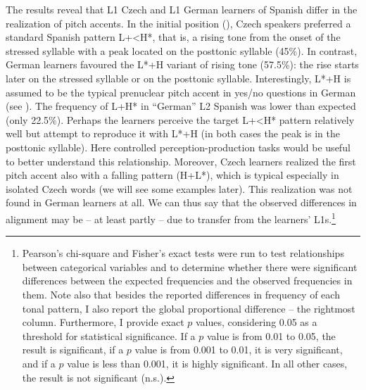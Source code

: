 The results reveal that L1 Czech and L1 German learners of Spanish differ in the realization of pitch accents. In the initial position (), Czech speakers preferred a standard Spanish pattern L+<H*, that is, a rising tone from the onset of the stressed syllable with a peak located on the posttonic syllable (45\%). In contrast, German learners favoured the L*+H variant of rising tone (57.5\%): the rise starts later on the stressed syllable or on the posttonic syllable. Interestingly, L*+H is assumed to be the typical prenuclear pitch accent in yes/no questions in German (see ). The frequency of L+H* in “German” L2 Spanish was lower than expected (only 22.5\%). Perhaps the learners perceive the target L+<H* pattern relatively well but attempt to reproduce it with L*+H (in both cases the peak is in the posttonic syllable). Here controlled perception-production tasks would be useful to better understand this relationship. Moreover, Czech learners realized the first pitch accent also with a falling pattern (H+L*), which is typical especially in isolated Czech words (we will see some examples later). This realization was not found in German learners at all. We can thus say that the observed differences in alignment may be -- at least partly -- due to transfer from the learners’ L1s.\footnote{Pearson’s chi-square and Fisher’s exact tests were run to test relationships between categorical variables and to determine whether there were significant differences between the expected frequencies and the observed frequencies in them. Note also that besides the reported differences in frequency of each tonal pattern, I also report the global proportional difference -- the rightmost column. Furthermore, I provide exact $p$ values, considering 0.05 as a threshold for statistical significance. If a $p$ value is from 0.01 to 0.05, the result is significant, if a $p$ value is from 0.001 to 0.01, it is very significant, and if a $p$ value is less than 0.001, it is highly significant. In all other cases, the result is not significant (n.s.).}

